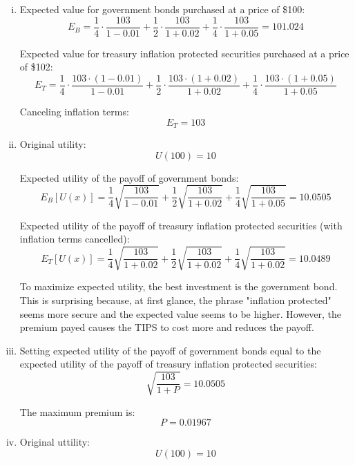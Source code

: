 \documentclass{article}
\begin{document}
\begin{enumerate}[i.]
    \item Expected value for government bonds purchased at a price of \$100:
        $$ E_{B} = \frac{ 1 }{ 4 } \cdot \frac{ 103 }{ 1 - 0.01 } + \frac{ 1 }{
        2 } \cdot \frac{ 103 }{ 1 + 0.02 } + \frac{ 1 }{ 4 } \cdot \frac{ 103 }{
        1 + 0.05 } = 101.024 $$

        Expected value for treasury inflation protected securities purchased at
        a price of \$102:
        $$ E_{T} = \frac{ 1 }{ 4 } \cdot \frac{ 103 \cdot ( 1 - 0.01 ) }{ 1 -
        0.01 } + \frac{ 1 }{ 2 } \cdot \frac{ 103 \cdot ( 1 + 0.02 ) }{ 1 + 0.02
        } + \frac{ 1 }{ 4 } \cdot \frac{ 103 \cdot ( 1 + 0.05 ) }{ 1 + 0.05 } $$

        Canceling inflation terms:
        $$ E_{T} = 103 $$

    \item Original utility:
        $$ U( 100 ) = 10 $$
        
        Expected utility of the payoff of government bonds:
        $$ E_{B}[ U( x ) ] = \frac{ 1 }{ 4 } \sqrt{ \frac{ 103 }{ 1 - 0.01 } }
        + \frac{ 1 }{ 2 } \sqrt{ \frac{ 103 }{ 1 + 0.02 } } + \frac{ 1 }{ 4 }
        \sqrt{ \frac{ 103 }{ 1 + 0.05 } } = 10.0505$$

        Expected utility of the payoff of treasury inflation protected
        securities (with inflation terms cancelled):
        $$ E_{T}[ U( x ) ] = \frac{ 1 }{ 4 } \sqrt{ \frac{ 103  }{ 1 + 0.02 } }
        + \frac{ 1 }{ 2 } \sqrt{ \frac{ 103 }{ 1 + 0.02 } } + \frac{ 1 }{ 4 }
        \sqrt{ \frac{ 103 } { 1 + 0.02 } } = 10.0489$$

        To maximize expected utility, the best investment is the government
        bond. This is surprising because, at first glance, the phrase "inflation
        protected" seems more secure and the expected value seems to be higher.
        However, the premium payed causes the TIPS to cost more and reduces the
        payoff.

    \item Setting expected utility of the payoff of government bonds equal to
        the expected utility of the payoff of treasury inflation protected
        securities:
        $$ \sqrt{ \frac{ 103 }{ 1 + P } } = 10.0505 $$

        The maximum premium is:
        $$ P = 0.01967 $$

    \item Original uttility:
        $$ U( 100 ) = 10 $$


\end{enumerate}
\end{document}
